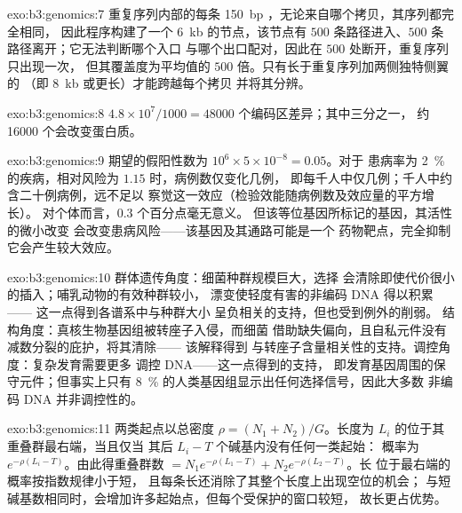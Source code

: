 \begin{solution}{exo:b3:genomics:7}
重复序列内部的每条 \qty{150}{bp} ，无论来自哪个拷贝，其序列都完全相同，
因此程序构建了一个 \qty{6}{kb} 的节点，该节点有
$500$ 条路径进入、$500$ 条路径离开；它无法判断哪个入口
与哪个出口配对，因此在 $500$ 处断开，重复序列只出现一次，
但其覆盖度为平均值的 $500$ 倍。只有长于重复序列加两侧独特侧翼的
（即 \qty{8}{kb} 或更长）才能跨越每个拷贝
并将其分辨。
\end{solution}

\begin{solution}{exo:b3:genomics:8}
$4.8\times 10^{7}/1000 = \num{48000}$ 个编码区差异；其中三分之一，
约 \num{16000} 个会改变蛋白质。
\end{solution}

\begin{solution}{exo:b3:genomics:9}
期望的假阳性数为 $10^{6}\times 5\times 10^{-8} = 0.05$。对于
患病率为 \qty{2}{\%} 的疾病，相对风险为 $1.15$ 时，病例数仅变化几例，
即每千人中仅几例；千人中约含二十例病例，远不足以
察觉这一效应（检验效能随病例数及效应量的平方增长）。
对个体而言，$0.3$ 个百分点毫无意义。
但该等位基因所标记的基因，其活性的微小改变
会改变患病风险——该基因及其通路可能是一个
药物靶点，完全抑制它会产生较大效应。
\end{solution}

\begin{solution}{exo:b3:genomics:10}
群体遗传角度：细菌种群规模巨大，选择
会清除即使代价很小的插入；哺乳动物的有效种群较小，
漂变使轻度有害的非编码 DNA 得以积累——
这一点得到各谱系中与种群大小
呈负相关的支持，但也受到例外的削弱。
结构角度：真核生物基因组被转座子入侵，而细菌
借助缺失偏向，且自私元件没有减数分裂的庇护，将其清除——
该解释得到
与转座子含量相关性的支持。调控角度：复杂发育需要更多
调控 DNA——这一点得到的支持，
即发育基因周围的保守元件；但事实上只有
\qty{8}{\%} 的人类基因组显示出任何选择信号，因此大多数
非编码 DNA 并非调控性的。
\end{solution}

\begin{solution}{exo:b3:genomics:11}
两类起点以总密度 $\rho = (N_{1} +
N_{2})/G$。长度为 $L_{i}$ 的位于其重叠群最右端，当且仅当
其后 $L_{i} - T$ 个碱基内没有任何一类起始：
概率为 $e^{-\rho(L_{i} - T)}$。由此得重叠群数 $= N_{1}
e^{-\rho(L_{1} - T)} + N_{2} e^{-\rho(L_{2} - T)}$。长
位于最右端的概率按指数规律小于短，
且每条长还消除了其整个长度上出现空位的机会；
与短碱基数相同时，会增加许多起始点，但每个受保护的窗口较短，
故长更占优势。
\end{solution}

